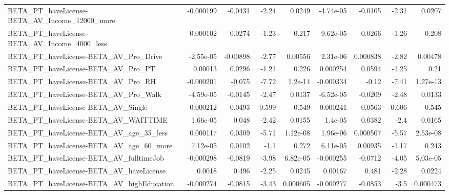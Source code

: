 \begin{tabular}{lrrrrrrrr}
BETA\_PT\_haveLicense-BETA\_AV\_Income\_12000\_more      &   -0.000199 &      -0.0431 &     -2.24 &   0.0249 &  -4.74e-05 &     -0.0105 &        -2.31 &        0.0207 \\
BETA\_PT\_haveLicense-BETA\_AV\_Income\_4000\_less       &    0.000102 &       0.0274 &     -1.23 &    0.217 &   9.62e-05 &      0.0266 &        -1.26 &         0.208 \\
BETA\_PT\_haveLicense-BETA\_AV\_Pro\_Drive              &   -2.55e-05 &     -0.00898 &     -2.77 &  0.00556 &   2.31e-06 &    0.000838 &        -2.82 &       0.00478 \\
BETA\_PT\_haveLicense-BETA\_AV\_Pro\_PT                 &     0.00013 &       0.0296 &     -1.21 &    0.226 &   0.000254 &      0.0594 &        -1.25 &          0.21 \\
BETA\_PT\_haveLicense-BETA\_AV\_Pro\_RH                 &   -0.000201 &       -0.075 &     -7.72 &  1.2e-14 &  -0.000334 &       -0.12 &        -7.41 &      1.27e-13 \\
BETA\_PT\_haveLicense-BETA\_AV\_Pro\_Walk               &   -4.59e-05 &      -0.0145 &     -2.47 &   0.0137 &  -6.52e-05 &     -0.0209 &        -2.48 &        0.0133 \\
BETA\_PT\_haveLicense-BETA\_AV\_Single                 &    0.000212 &       0.0493 &    -0.599 &    0.549 &   0.000241 &      0.0563 &       -0.606 &         0.545 \\
BETA\_PT\_haveLicense-BETA\_AV\_WAITTIME               &    1.66e-05 &        0.048 &     -2.42 &   0.0155 &    1.4e-05 &      0.0382 &         -2.4 &        0.0165 \\
BETA\_PT\_haveLicense-BETA\_AV\_age\_35\_less            &    0.000117 &       0.0309 &     -5.71 & 1.12e-08 &   1.96e-06 &    0.000507 &        -5.57 &      2.53e-08 \\
BETA\_PT\_haveLicense-BETA\_AV\_age\_60\_more            &    7.12e-05 &       0.0102 &      -1.1 &    0.272 &   6.11e-05 &     0.00935 &        -1.17 &         0.243 \\
BETA\_PT\_haveLicense-BETA\_AV\_fulltimeJob            &   -0.000298 &      -0.0819 &     -3.98 & 6.82e-05 &  -0.000255 &     -0.0712 &        -4.05 &      5.03e-05 \\
BETA\_PT\_haveLicense-BETA\_AV\_haveLicense            &      0.0018 &        0.496 &     -2.25 &   0.0245 &    0.00167 &       0.481 &        -2.28 &        0.0224 \\
BETA\_PT\_haveLicense-BETA\_AV\_highEducation          &   -0.000274 &      -0.0815 &     -3.43 & 0.000605 &  -0.000277 &     -0.0853 &         -3.5 &      0.000473 \\

\end{tabular}
